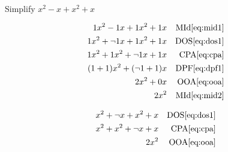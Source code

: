 \documentclass[20150903-160354-rs2.2-MarksMathNotebook.tex]{subfiles}
\begin{document}
\begin{example}[id:20141106-154547] \label{20141106-154547}  \hfill \\

Simplify $x^2-x+x^2+x$

\soln

\solnsteps
\begin{align*}
1x^2-1x+1x^2+1x && \text{MId} \eqref{eq:mid1} \\
1x^2+\neg 1 x + 1x^2+1x && \text{DOS} \eqref{eq:dos1} \\
1x^2+1x^2+\neg 1x+1x && \text{CPA} \eqref{eq:cpa} \\
(1+1)x^2+(\neg 1 + 1)x && \text{DPF} \eqref{eq:dpf1} \\
2x^2+0x && \text{OOA} \eqref{eq:ooa} \\
2x^2 && \text{MId} \eqref{eq:mid2}
\end{align*}

\soln

\lesssteps
\begin{align*}
x^2 + \neg x + x^2 + x && \text{DOS} \eqref{eq:dos1} \\
x^2 + x^2 + \neg x + x && \text{CPA} \eqref{eq:cpa} \\
2x^2 && \text{OOA} \eqref{eq:ooa}
\end{align*}

\end{example}

\end{document}
